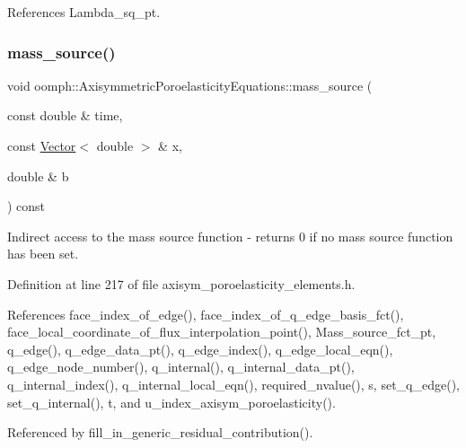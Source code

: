 References Lambda\+\_\+sq\+\_\+pt.

\mbox{\label{classoomph_1_1AxisymmetricPoroelasticityEquations_a0a863fa42e1ee95ba85bec4bd1bda7a5}} 
\subsubsection{\texorpdfstring{mass\+\_\+source()}{mass\_source()}}
{\footnotesize\ttfamily void oomph\+::\+Axisymmetric\+Poroelasticity\+Equations\+::mass\+\_\+source (\begin{DoxyParamCaption}\item[{const double \&}]{time,  }\item[{const \hyperlink{classoomph_1_1Vector}{Vector}$<$ double $>$ \&}]{x,  }\item[{double \&}]{b }\end{DoxyParamCaption}) const\hspace{0.3cm}{\ttfamily [inline]}}



Indirect access to the mass source function -\/ returns 0 if no mass source function has been set. 



Definition at line 217 of file axisym\+\_\+poroelasticity\+\_\+elements.\+h.



References face\+\_\+index\+\_\+of\+\_\+edge(), face\+\_\+index\+\_\+of\+\_\+q\+\_\+edge\+\_\+basis\+\_\+fct(), face\+\_\+local\+\_\+coordinate\+\_\+of\+\_\+flux\+\_\+interpolation\+\_\+point(), Mass\+\_\+source\+\_\+fct\+\_\+pt, q\+\_\+edge(), q\+\_\+edge\+\_\+data\+\_\+pt(), q\+\_\+edge\+\_\+index(), q\+\_\+edge\+\_\+local\+\_\+eqn(), q\+\_\+edge\+\_\+node\+\_\+number(), q\+\_\+internal(), q\+\_\+internal\+\_\+data\+\_\+pt(), q\+\_\+internal\+\_\+index(), q\+\_\+internal\+\_\+local\+\_\+eqn(), required\+\_\+nvalue(), s, set\+\_\+q\+\_\+edge(), set\+\_\+q\+\_\+internal(), t, and u\+\_\+index\+\_\+axisym\+\_\+poroelasticity().



Referenced by fill\+\_\+in\+\_\+generic\+\_\+residual\+\_\+contribution().

